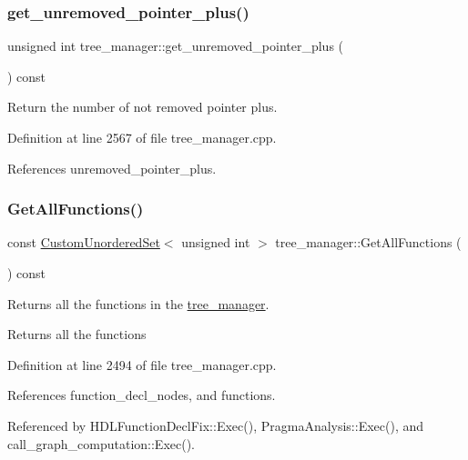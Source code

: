 \subsubsection{\texorpdfstring{get\+\_\+unremoved\+\_\+pointer\+\_\+plus()}{get\_unremoved\_pointer\_plus()}}
{\footnotesize\ttfamily unsigned int tree\+\_\+manager\+::get\+\_\+unremoved\+\_\+pointer\+\_\+plus (\begin{DoxyParamCaption}{ }\end{DoxyParamCaption}) const}



Return the number of not removed pointer plus. 



Definition at line 2567 of file tree\+\_\+manager.\+cpp.



References unremoved\+\_\+pointer\+\_\+plus.

\mbox{\label{classtree__manager_a4371ea7d0da5c860644a78af338764b3}} 
\subsubsection{\texorpdfstring{Get\+All\+Functions()}{GetAllFunctions()}}
{\footnotesize\ttfamily const \hyperlink{classCustomUnorderedSet}{Custom\+Unordered\+Set}$<$ unsigned int $>$ tree\+\_\+manager\+::\+Get\+All\+Functions (\begin{DoxyParamCaption}{ }\end{DoxyParamCaption}) const}



Returns all the functions in the \hyperlink{classtree__manager}{tree\+\_\+manager}. 

\begin{DoxyReturn}{Returns}
all the functions 
\end{DoxyReturn}


Definition at line 2494 of file tree\+\_\+manager.\+cpp.



References function\+\_\+decl\+\_\+nodes, and functions.



Referenced by H\+D\+L\+Function\+Decl\+Fix\+::\+Exec(), Pragma\+Analysis\+::\+Exec(), and call\+\_\+graph\+\_\+computation\+::\+Exec().

